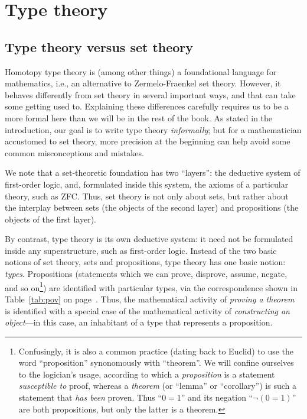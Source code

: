 \chapter{Type theory}
\label{cha:typetheory}

\section{Type theory versus set theory}
\label{sec:types-vs-sets}

Homotopy type theory is (among other things) a foundational language for mathematics, i.e., an alternative to Zermelo-Fraenkel set theory.
However, it behaves differently from set theory in several important ways, and that can take some getting used to.
Explaining these differences carefully requires us to be a more formal here than we will be in the rest of the book.
As stated in the introduction, our goal is to write type theory \emph{informally}; but for a mathematician accustomed to set theory, more precision at the beginning can help avoid some common misconceptions and mistakes.

We note that a set-theoretic foundation has two ``layers'': the deductive system of first-order logic, and, formulated inside this system, the axioms of a particular theory, such as ZFC.
Thus, set theory is not only about sets, but rather about the interplay between sets (the objects of the second layer) and propositions (the objects of the first layer).

By contrast, type theory is its own deductive system: it need not be formulated inside any superstructure, such as first-order logic.
Instead of the two basic notions of set theory, sets and propositions, type theory has one basic notion: \emph{types}.
Propositions (statements which we can prove, disprove, assume, negate, and so on\footnote{Confusingly, it is also a common practice (dating back to Euclid) to use the word ``proposition'' synonomously with ``theorem''.
  We will confine ourselves to the logician's usage, according to which a \emph{proposition} is a statement \emph{susceptible to} proof, whereas a \emph{theorem} (or ``lemma'' or ``corollary'') is such a statement that \emph{has been} proven.
Thus ``$0=1$'' and its negation ``$\neg(0=1)$'' are both propositions, but only the latter is a theorem.}) are identified with particular types, via the correspondence shown in Table~\ref{tab:pov} on page~\pageref{tab:pov}.
Thus, the mathematical activity of \emph{proving a theorem} is identified with a special case of the mathematical activity of \emph{constructing an object}---in this case, an inhabitant of a type that represents a proposition.

